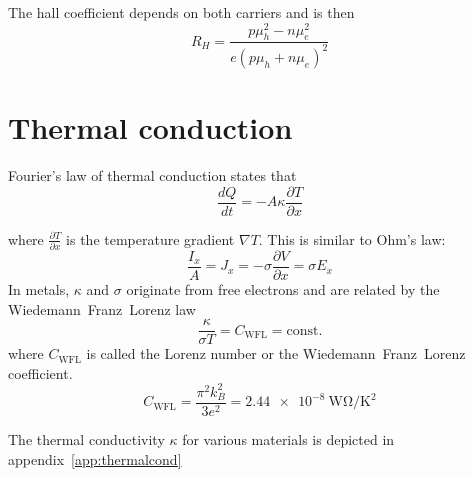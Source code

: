 The hall coefficient depends on both carriers and is then
\begin{equation}
    R_H = \frac{p \mu_h^2 - n \mu_e^2}{e\left(p \mu_h + n \mu_e \right)^2}
\end{equation}


\section{Thermal conduction}

Fourier's law of thermal conduction states that
\begin{equation}
	\frac{dQ}{dt} = -A \kappa \frac{\partial T}{\partial x}
\end{equation}

where $\frac{\partial T}{\partial x}$ is the temperature gradient $\nabla T$.
This is similar to Ohm's law:
\begin{equation*}
	\frac{I_x}{A} = J_x = - \sigma \frac{\partial V}{\partial x} = \sigma E_x
\end{equation*}
In metals, $\kappa$ and $\sigma$ originate from free electrons and are related by the Wiedemann~Franz~Lorenz law
\begin{equation}
	\frac{\kappa}{\sigma T} = C_{\mathrm{WFL}} = \text{const.}
\end{equation}
where $C_{\mathrm{WFL}}$ is called the Lorenz number or the Wiedemann~Franz~Lorenz coefficient.
\begin{equation}
	C_{\mathrm{WFL}} = \frac{\pi^2 k_B^2}{3 e^2} = \SI{2.44e-8}{\watt\ohm\per\kelvin\squared}
\end{equation}

The thermal conductivity $\kappa$ for various materials is depicted in appendix~\ref{app:thermalcond}